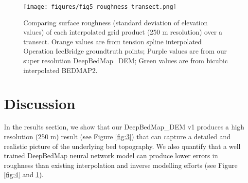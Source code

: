 \documentclass[tc, manuscript]{copernicus}
\begin{document}
\begin{figure*}[htbp]
  \centering
  \qquad
  \caption{
    Spatial 2D view of grids over Thwaites Glacier, West Antarctica.
    Plotted on an Antarctic Stereographic Projection (EPSG:3031) with elevation and standard deviation values in metres referenced to the WGS84 datum.
    Orange groundtruth points in \textbf{a} correspond to transect sampling locations used in Figure \ref{fig:5}.
    Note that color scale of \textbf{b} and \textbf{c} is twice that of \textbf{d}.
  }
  \label{fig:4}
\end{figure*}

\begin{figure}[htbp]
    \texttt{[image: figures/fig5\_roughness\_transect.png]}
    \caption{
      Comparing surface roughness (standard deviation of elevation values) of each interpolated grid product (250 m resolution) over a transect.
      Orange values are from tension spline interpolated Operation IceBridge groundtruth points;
      Purple values are from our super resolution DeepBedMap\_DEM;
      Green values are from bicubic interpolated BEDMAP2.
    }
    \label{fig:5}
\end{figure}


\section{Discussion}

In the results section, we show that our DeepBedMap\_DEM v1 produces a high resolution (250 m) result (see Figure \ref{fig:3}) that can capture a detailed and realistic picture of the underlying bed topography.
We also quantify that a well trained DeepBedMap neural network model can produce lower errors in roughness than existing interpolation and inverse modelling efforts (see Figure \ref{fig:4} and \ref{fig:5}).
\end{document}
